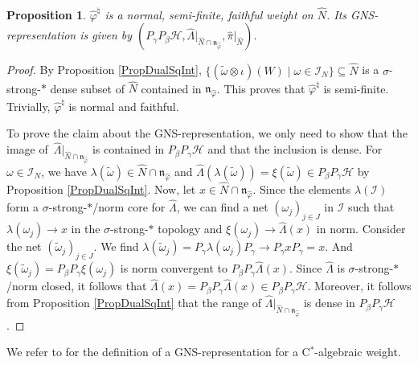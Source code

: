 \documentclass[11pt]{article}
\numberwithin{equation}{section}
\newtheorem{prop}[thm]{Proposition}
\theoremstyle{definition}
\newcommand{\cHil}{\mathcal{H}}
\begin{document}
\begin{prop}\label{PropNSFWeightVNA}
 $\hat{\varphi}^\natural$  is a normal, semi-finite, faithful weight on $\hat{N}$. Its GNS-representation is given by $(P_\gamma P_\beta \cHil, \hat{\Lambda} \vert_{\hat{N} \cap \mathfrak{n}_{\hat{\varphi}}}, \hat{\pi}\vert_{\hat{N}})$.
\end{prop}
\begin{proof}
By Proposition \ref{PropDualSqInt}, $\{ (\tilde{\omega} \otimes \iota)(W) \mid \omega \in \mathcal{I}_N \} \subseteq \hat{N}$ is a $\sigma$-strong-$\ast$ dense subset of $\hat{N}$ contained in $\mathfrak{n}_{\hat{\varphi}}$. This proves that $\hat{\varphi}^\natural$ is semi-f\/inite. Trivially,  $\hat{\varphi}^\natural$ is normal and faithful.

 To prove the claim about the GNS-representation, we only need to show that the image of~$\hat{\Lambda} \vert_{\hat{N} \cap \mathfrak{n}_{\hat{\varphi}}}$ is contained in   $P_\beta P_\gamma \cHil$ and that the inclusion is dense.
For $\omega \in \mathcal{I}_N$, we have $\lambda(\tilde{\omega}) \in \hat{N} \cap \mathfrak{n}_{\hat{\varphi}}$ and $\hat{\Lambda}(\lambda(\tilde{\omega})) = \xi(\tilde{\omega}) \in P_\beta P_\gamma \cHil$ by Proposition \ref{PropDualSqInt}.  Now, let $x \in \hat{N} \cap \mathfrak{n}_{\hat{\varphi}}$. Since the elements $\lambda(\mathcal{I})$ form a $\sigma$-strong-$\ast$/norm core for $\hat{\Lambda}$, we can f\/ind a net $(\omega_j)_{j \in J}$ in $\mathcal{I}$ such that $\lambda(\omega_j) \rightarrow x$ in the $\sigma$-strong-$\ast$ topology and $\xi(\omega_j) \rightarrow \hat{\Lambda}(x)$ in norm.  Consider the net $(\tilde{\omega}_j)_{j \in J}$. We f\/ind $\lambda(\tilde{\omega}_j)  = P_\gamma \lambda(\omega_j) P_\gamma \rightarrow P_\gamma x P_\gamma = x$. And $\xi(\tilde{\omega}_j) = P_\beta P_\gamma \xi(\omega_j)$ is norm convergent to $ P_\beta P_\gamma \hat{\Lambda}(x)$. Since $\hat{\Lambda}$ is $\sigma$-strong-$\ast$/norm closed, it follows that $\hat{\Lambda}(x) =   P_\beta P_\gamma \hat{\Lambda}(x) \in P_\beta P_\gamma \cHil$. Moreover, it follows from Proposition \ref{PropDualSqInt} that the range of  $\hat{\Lambda} \vert_{\hat{N} \cap \mathfrak{n}_{\hat{\varphi}}}$ is dense in $P_\beta P_\gamma \cHil$.
\end{proof}

We refer to \cite[Section 1.1]{KusVae} for the def\/inition of a GNS-representation for a C$^\ast$-algebraic weight.
\end{document}
